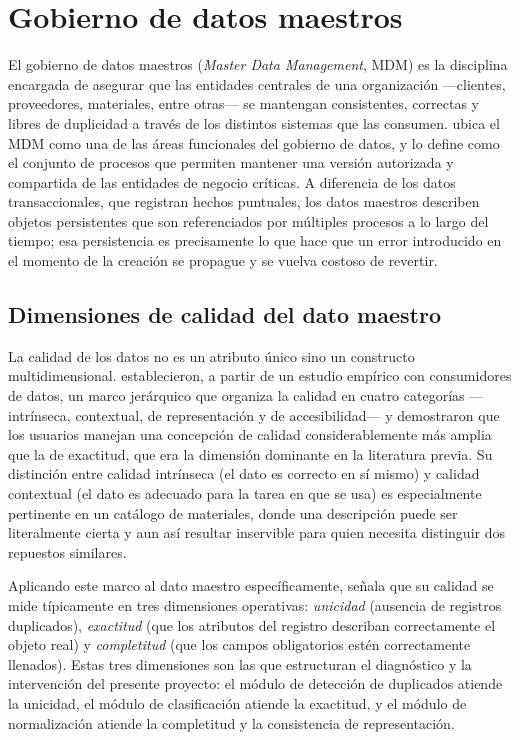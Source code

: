 \section{Gobierno de datos maestros}
El gobierno de datos maestros (\textit{Master Data Management}, MDM) es la disciplina encargada de asegurar que las entidades centrales de una organización —clientes, proveedores, materiales, entre otras— se mantengan consistentes, correctas y libres de duplicidad a través de los distintos sistemas que las consumen.  ubica el MDM como una de las áreas funcionales del gobierno de datos, y lo define como el conjunto de procesos que permiten mantener una versión autorizada y compartida de las entidades de negocio críticas. A diferencia de los datos transaccionales, que registran hechos puntuales, los datos maestros describen objetos persistentes que son referenciados por múltiples procesos a lo largo del tiempo; esa persistencia es precisamente lo que hace que un error introducido en el momento de la creación se propague y se vuelva costoso de revertir.

\subsection{Dimensiones de calidad del dato maestro}
La calidad de los datos no es un atributo único sino un constructo multidimensional.  establecieron, a partir de un estudio empírico con consumidores de datos, un marco jerárquico que organiza la calidad en cuatro categorías —intrínseca, contextual, de representación y de accesibilidad— y demostraron que los usuarios manejan una concepción de calidad considerablemente más amplia que la de exactitud, que era la dimensión dominante en la literatura previa. Su distinción entre calidad intrínseca (el dato es correcto en sí mismo) y calidad contextual (el dato es adecuado para la tarea en que se usa) es especialmente pertinente en un catálogo de materiales, donde una descripción puede ser literalmente cierta y aun así resultar inservible para quien necesita distinguir dos repuestos similares.

Aplicando este marco al dato maestro específicamente,  señala que su calidad se mide típicamente en tres dimensiones operativas: \textit{unicidad} (ausencia de registros duplicados), \textit{exactitud} (que los atributos del registro describan correctamente el objeto real) y \textit{completitud} (que los campos obligatorios estén correctamente llenados). Estas tres dimensiones son las que estructuran el diagnóstico y la intervención del presente proyecto: el módulo de detección de duplicados atiende la unicidad, el módulo de clasificación atiende la exactitud, y el módulo de normalización atiende la completitud y la consistencia de representación.

